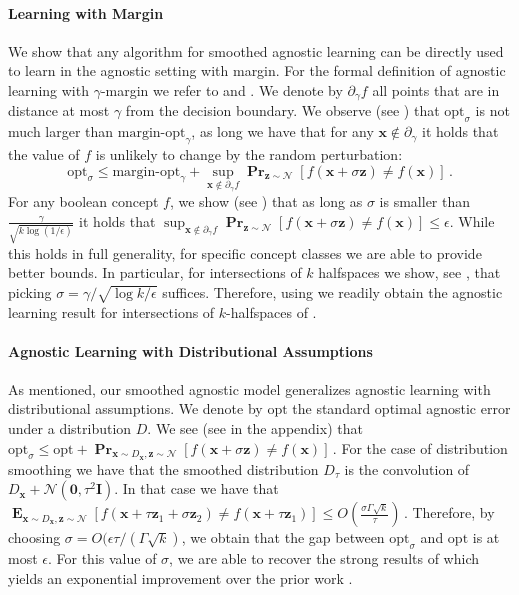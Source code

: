 \documentclass[10pt,a4paper]{article}
\renewcommand\vec[1]{\mathbf{#1}}
\DeclareMathOperator*{\pr}{\mathbf{Pr}}
\DeclareMathOperator*{\E}{\mathbf{E}}
\newcommand{\normal}{\mathcal{N}}
\newcommand{\eps}{\epsilon}
\newcommand{\opt}{\mathrm{opt}}
\newcommand{\1}{\Ind}
\newcommand{\x}{\vec x}
\begin{document}
\paragraph{Learning with Margin}
We show that any algorithm
for smoothed agnostic learning can be directly used to learn in the agnostic setting with margin.
For the formal definition of agnostic learning with $\gamma$-margin we refer to 
and .
We denote by $\partial_\gamma f$ all points that are in distance at most $\gamma$ from the decision boundary.
We observe (see ) that $\opt_\sigma$ is not much larger than $\text{margin-opt}_\gamma$, as long we have that for any $\x\notin\partial_\gamma$ it holds that the value of $f$ is unlikely to change by the random perturbation:
\[
\opt_\sigma \leq \text{margin-opt}_\gamma + \sup_{\x \notin \partial_\gamma f} \pr_{\vec z \sim \normal}[f(\x + \sigma \vec z) \neq f(\x)] \,.
\]
For any boolean concept $f$, we show  (see ) that 
as long as $\sigma$ is smaller than $\frac{\gamma}{\sqrt{k \log({1}/{\eps})}}$ it holds that 
$\sup_{\x \notin \partial_\gamma f} \pr_{\vec z \sim \normal}[f(\x + \sigma \vec z) \neq f(\x)] \leq \eps$.
While this holds in full generality, for specific concept classes we are able to provide better bounds.
In particular, for intersections of $k$ halfspaces we show, see ,
that picking $\sigma = \gamma/\sqrt{\log k/\eps}$ suffices.  Therefore, using 
we readily obtain the agnostic learning result for intersections of $k$-halfspaces of .

\paragraph{Agnostic Learning with Distributional Assumptions}
As mentioned, our smoothed agnostic model generalizes agnostic learning with distributional assumptions.
We denote by $\opt$ the standard optimal agnostic error under a distribution $D$.  
We see (see  in the appendix) that 
\(
\opt_\sigma \leq \opt + \pr_{\x \sim D_\x, \vec z \sim \normal}[f(\x + \sigma \vec z) \neq f(\x)]\,.
\)
For the case of distribution smoothing we have that the smoothed distribution $D_\tau$  is the convolution of  $D_\x + \normal(\vec 0, \tau^2 \vec I)$.  In that case we have that 
$
\E_{\x \sim D_\x, \vec z \sim \normal }[f(\x + \tau \vec z_1 + \sigma \vec z_2) \neq f(\x+ \tau \vec z_1)] \leq 
O(\frac{\sigma \Gamma \sqrt{k}}{\tau}) \,.
$
Therefore, by choosing $\sigma = O(\eps \tau/(\Gamma \sqrt{k})$, we obtain that the gap between $\opt_{\sigma}$ and $\opt$
is at most $\eps$. For this value of $\sigma$, we are able to recover the strong results of  which yields an exponential improvement over the prior work \cite{Kane2013LearningHalfspacesLogConcave}.
\end{document}
